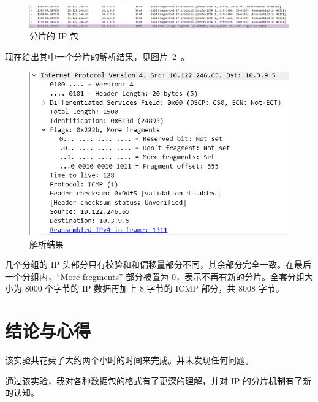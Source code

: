 \documentclass[blue,normal,cn]{elegantnote}
\begin{document}
\begin{figure}[!htbp]
	\centering
	\includegraphics[width=.7\textwidth]{fIP_packets.png}
	\caption{分片的 IP 包}
	\label{fIP_packets}
\end{figure}

现在给出其中一个分片的解析结果，见图片~\ref{fIP_results}~。

\begin{figure}[!htbp]
	\centering
	\includegraphics[width=.7\textwidth]{fIP_results.png}
	\caption{解析结果}
	\label{fIP_results}
\end{figure}

几个分组的 IP 头部分只有校验和和偏移量部分不同，其余部分完全一致。在最后一个分组内，``More fregments'' 部分被置为 0，表示不再有新的分片。全套分组大小为 8000 个字节的 IP 数据再加上 8 字节的 ICMP 部分，共 8008 字节。

\section{结论与心得}
该实验共花费了大约两个小时的时间来完成。并未发现任何问题。

通过该实验，我对各种数据包的格式有了更深的理解，并对 IP 的分片机制有了新的认知。
\end{document}
